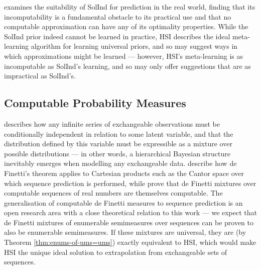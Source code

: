 \documentclass[11pt]{article}
\begin{document}
\citet{Sterkenburg2018} examines the suitability of SolInd for prediction in the real world, finding that its incomputability is a fundamental obstacle to its practical use and that no computable approximation can have any of its optimality properties.
While the SolInd prior indeed cannot be learned in practice, HSI describes the ideal meta-learning algorithm for learning universal priors, and so may suggest ways in which approximations might be learned --- however, HSI's meta-learning is as incomputable as SolInd's learning, and so may only offer suggestions that are as impractical as SolInd's.

\subsection{Computable Probability Measures}

\citet{deFinetti1931} describes how any infinite series of exchangeable observations must be conditionally independent in relation to some latent variable, and that the distribution defined by this variable must be expressible as a mixture over possible distributions --- in other words, a hierarchical Bayesian structure inevitably emerges when modelling any exchangeable data.
\citet{HewittSavage1955} describe how de Finetti's theorem applies to Cartesian products such as the Cantor space over which sequence prediction is performed, while \citet{FreerRoy2009, FreerRoy2012} prove that de Finetti mixtures over computable sequences of real numbers are themselves computable.
The generalisation of computable de Finetti measures to sequence prediction is an open research area with a close theoretical relation to this work --- we expect that de Finetti mixtures of enumerable semimeasures over sequences can be proven to also be enumerable semimeasures. If these mixtures are universal, they are (by Theorem \ref{thm:enums-of-ums=ums}) exactly equivalent to HSI, which would make HSI the unique ideal solution to extrapolation from exchangeable sets of sequences.
\end{document}
